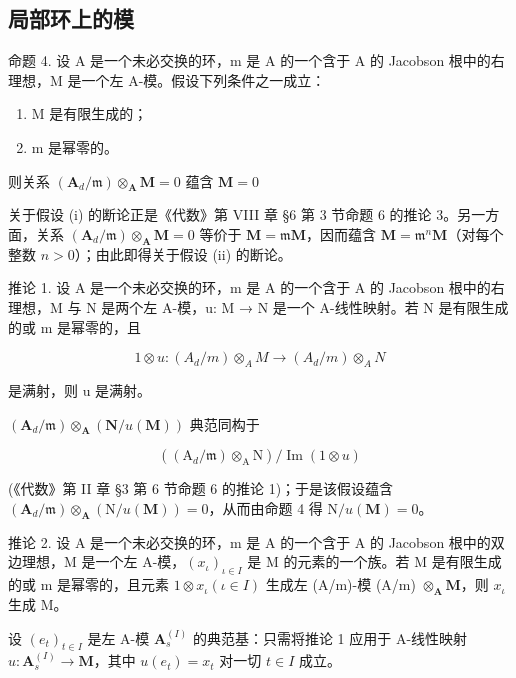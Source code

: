 \subsection{局部环上的模}

命题 4. 设 A 是一个未必交换的环，m 是 A 的一个含于 A 的 Jacobson 根中的右理想，M 是一个左 A-模。假设下列条件之一成立：

\begin{enumerate}
\def\labelenumi{(\roman{enumi})}
\item
  M 是有限生成的；
\item
  m 是幂零的。
\end{enumerate}

则关系 \((\mathbf{A}_d / \mathfrak{m})\otimes_{\mathbf{A}}\mathbf{M} = 0\) 蕴含 \(\mathbf{M} = 0\)

关于假设 (i) 的断论正是《代数》第 VIII 章 §6 第 3 节命题 6 的推论 3。另一方面，关系 \((\mathbf{A}_d / \mathfrak{m}) \otimes_{\mathbf{A}} \mathbf{M} = 0\) 等价于 \(\mathbf{M} = \mathfrak{m}\mathbf{M}\)，因而蕴含 \(\mathbf{M} = \mathfrak{m}^n\mathbf{M}\)（对每个整数 \(n > 0\)）；由此即得关于假设 (ii) 的断论。

推论 1. 设 A 是一个未必交换的环，m 是 A 的一个含于 A 的 Jacobson 根中的右理想，M 与 N 是两个左 A-模，u: M → N 是一个 A-线性映射。若 N 是有限生成的或 m 是幂零的，且

\[
1 \otimes u: (A _ {d} / m) \otimes_ {A} M \rightarrow (A _ {d} / m) \otimes_ {A} N
\]

是满射，则 u 是满射。

\((\mathbf{A}_d / \mathfrak{m})\otimes_{\mathbf{A}}(\mathbf{N} / u(\mathbf{M}))\) 典范同构于

\[
((\mathrm{A} _ {d} / \mathfrak {m}) \otimes_ {\mathrm{A}} \mathrm{N}) / \operatorname{Im} (1 \otimes u)
\]

(《代数》第 II 章 §3 第 6 节命题 6 的推论 1)；于是该假设蕴含 \((\mathbf{A}_d / \mathfrak{m}) \otimes_{\mathbf{A}} (\mathrm{N} / u(\mathbf{M})) = 0\)，从而由命题 4 得 \(\mathrm{N} / u(\mathbf{M}) = 0\)。

推论 2. 设 A 是一个未必交换的环，m 是 A 的一个含于 A 的 Jacobson 根中的双边理想，M 是一个左 A-模，\((x_{\iota})_{\iota \in I}\) 是 M 的元素的一个族。若 M 是有限生成的或 m 是幂零的，且元素 \(1 \otimes x_{\iota} (\iota \in I)\) 生成左 (A/m)-模 (A/m) \(\otimes_{\mathbf{A}} \mathbf{M}\)，则 \(x_{\iota}\) 生成 M。

设 \((e_t)_{t \in I}\) 是左 A-模 \(\mathbf{A}_s^{(I)}\) 的典范基：只需将推论 1 应用于 A-线性映射 \(u: \mathbf{A}_s^{(I)} \to \mathbf{M}\)，其中 \(u(e_t) = x_t\) 对一切 \(t \in I\) 成立。

